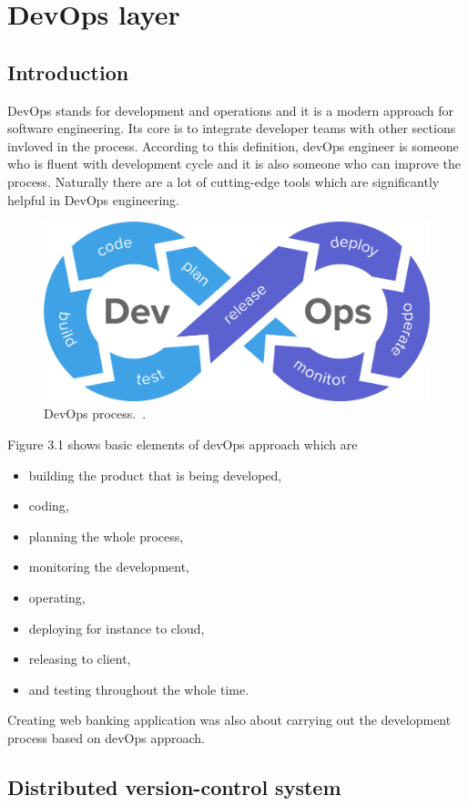 \documentclass[a4paper,12pt]{book}
\newcommand\tab[1][1cm]{\hspace*{#1}}
\begin{document}
{{     
}

\chapter{DevOps layer}
\section{Introduction}
{
\tab DevOps stands for development and operations and it is a modern approach for software engineering. Its core is to integrate developer teams with other sections invloved in the process. According to this definition, devOps engineer is someone who is fluent with development cycle and it is also someone who can improve the process. Naturally there are a lot of cutting-edge tools which are significantly helpful in DevOps engineering. 

\bigskip
\begin{figure}[H]
  \centering
    \includegraphics[width=1.0\textwidth]{devops}
    \caption{DevOps process.~\cite{devops}.}
\end{figure}
    
Figure 3.1 shows basic elements of devOps approach which are
\begin{itemize}
	\item building the product that is being developed,
	\item coding,
	\item planning the whole process,
	\item monitoring the development,
	\item operating,
	\item deploying for instance to cloud,
	\item releasing to client,
	\item and testing throughout the whole time.
\end{itemize} 
	
\bigskip
Creating web banking application was also about carrying out the development process based on devOps approach. 
}
\section{Distributed version-control system}}
\end{document}
